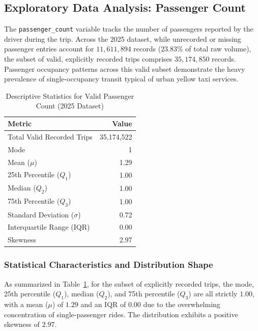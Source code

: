 \documentclass[11pt,a4paper]{article}
\begin{document}
\subsection{Exploratory Data Analysis: Passenger Count}
\label{sec:eda_passenger_count}

The \texttt{passenger\_count} variable tracks the number of passengers reported by the driver during the trip. Across the 2025 dataset, while unrecorded or missing passenger entries account for $11,611,894$ records ($23.83\%$ of total raw volume), the subset of valid, explicitly recorded trips comprises $35,174,850$ records. Passenger occupancy patterns across this valid subset demonstrate the heavy prevalence of single-occupancy transit typical of urban yellow taxi services.

\begin{table}[htbp]
\centering
\caption{Descriptive Statistics for Valid Passenger Count (2025 Dataset)}
\label{tab:stats_passenger_count}
\begin{tabular}{lr}
\toprule
\textbf{Metric} & \textbf{Value} \\
\midrule
Total Valid Recorded Trips & 35,174,522 \\
Mode & 1 \\
Mean ($\mu$) & 1.29 \\
25th Percentile ($Q_1$) & 1.00 \\
Median ($Q_2$) & 1.00 \\
75th Percentile ($Q_3$) & 1.00 \\
Standard Deviation ($\sigma$) & 0.72 \\
Interquartile Range (IQR) & 0.00 \\
Skewness & 2.97 \\
\bottomrule
\end{tabular}
\end{table}

\subsubsection{Statistical Characteristics and Distribution Shape}
As summarized in Table~\ref{tab:stats_passenger_count}, for the subset of explicitly recorded trips, the mode, 25th percentile ($Q_1$), median ($Q_2$), and 75th percentile ($Q_3$) are all strictly $1.00$, with a mean ($\mu$) of $1.29$ and an IQR of $0.00$ due to the overwhelming concentration of single-passenger rides. The distribution exhibits a positive skewness of $2.97$.
\end{document}
